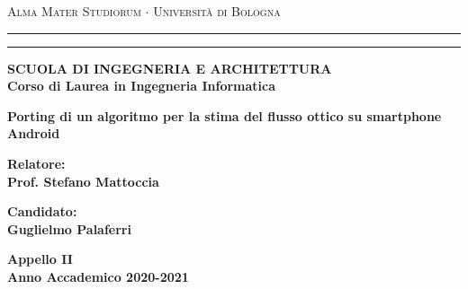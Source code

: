 

%
%



\begin{titlepage}
\begin{center}
    

{{\Large{\textsc{Alma Mater Studiorum $\cdot$ Universit\`a di
Bologna}}}} \rule[0.1cm]{15.8cm}{0.1mm}
\rule[0.5cm]{15.8cm}{0.6mm}
{\small{\bf SCUOLA DI INGEGNERIA E ARCHITETTURA\\
Corso di Laurea in Ingegneria Informatica }}
\end{center}
\vspace{35mm}
\begin{center}
{\LARGE{\bf Porting di un algoritmo per la stima del flusso ottico su smartphone Android}}\\
\end{center}
\vspace{50mm}
\par
\noindent
\begin{minipage}[t]{0.47\textwidth}
{\large{\bf Relatore:\\
Prof. Stefano Mattoccia}}
\end{minipage}
\hfill
\begin{minipage}[t]{0.47\textwidth}\raggedleft
{\large{\bf Candidato:\\
Guglielmo Palaferri}}
\end{minipage}
\vspace{20mm}
\begin{center}
{\large{\bf Appello II\\%
Anno Accademico 2020-2021}}%
\end{center}
\end{titlepage}

%
